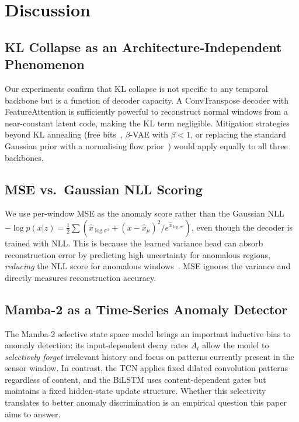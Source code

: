 \documentclass[10pt,twocolumn]{article}
\begin{document}
\section{Discussion}

\subsection{KL Collapse as an Architecture-Independent Phenomenon}

Our experiments confirm that KL collapse is not specific to any temporal
backbone but is a function of decoder capacity. A ConvTranspose decoder with
FeatureAttention is sufficiently powerful to reconstruct normal windows from a
near-constant latent code, making the KL term negligible. Mitigation strategies
beyond KL annealing (free bits~\cite{kingma2016improved}, $\beta$-VAE with
$\beta < 1$, or replacing the standard Gaussian prior with a normalising flow
prior~\cite{rezende2015variational}) would apply equally to all three backbones.

\subsection{MSE vs.\ Gaussian NLL Scoring}

We use per-window MSE as the anomaly score rather than the Gaussian NLL
$-\log p(x|z) = \frac{1}{2}\sum (\hat{x}_{\log\sigma^2} + (x - \hat{x}_\mu)^2 /
e^{\hat{x}_{\log\sigma^2}})$, even though the decoder is trained with NLL.
This is because the learned variance head can absorb reconstruction error by
predicting high uncertainty for anomalous regions, \emph{reducing} the NLL
score for anomalous windows~\cite{you2019robust}. MSE ignores the variance and
directly measures reconstruction accuracy.

\subsection{Mamba-2 as a Time-Series Anomaly Detector}

The Mamba-2 selective state space model brings an important inductive bias to
anomaly detection: its input-dependent decay rates $\bar{A}_t$ allow the model
to \emph{selectively forget} irrelevant history and focus on patterns currently
present in the sensor window. In contrast, the TCN applies fixed dilated
convolution patterns regardless of content, and the BiLSTM uses content-dependent
gates but maintains a fixed hidden-state update structure.  Whether this
selectivity translates to better anomaly discrimination is an empirical question
this paper aims to answer.
\end{document}
